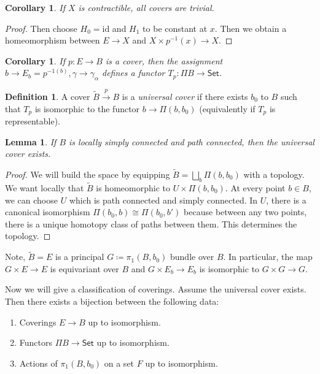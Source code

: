 \documentclass[leqno, openany]{memoir}
\newtheorem{cor}[thm]{Corollary}
\newtheorem{lem}[thm]{Lemma}
\theoremstyle{definition}
\newtheorem{defn}[thm]{Definition}
\theoremstyle{remark}
\theoremstyle{plain}
\theoremstyle{definition}
\theoremstyle{remark}
\newcommand{\mr}[1]{\mathrm{#1}}
\newcommand{\ms}[1]{\mathsf{#1}}
\newcommand{\wt}[1]{\widetilde{#1}}
\begin{document}
\begin{cor} If $X$ is contractible, all covers are trivial.  \end{cor}

\begin{proof} Then choose $H_0 = \mr{id}$ and $H_1$ to be constant at $x$. Then
we obtain a homeomorphism between $E \to X$ and $X \times p^{-1}(x) \to X$.
\end{proof}

\begin{cor} If $p: E \to B$ is a cover, then the assignment $b \to E_b =
p^{-1(b)}, \gamma \to \gamma_{\alpha}$ defines a functor $T_p: \Pi B \to
\ms{Set}$.  \end{cor}

\begin{defn} A cover $\wt{B} \xrightarrow{p} B$ is a \textit{universal cover}
if there exists $b_0$ to $B$ such that $T_p$ is isomorphic to the functor $b
\to \Pi(b,b_0)$ (equivalently if $T_p$ is representable).  \end{defn}

\begin{lem} If $B$ is locally simply connected and path connected, then the
universal cover exists.  \end{lem}

\begin{proof} We will build the space by equipping $\wt{B} = \bigsqcup_b
    \Pi(b,b_0)$ with a topology. We want locally that $\wt{B}$ is homeomorphic
    to $U \times \Pi(b,b_0)$. At every point $b \in B$, we can choose $U$ which
    is path connected and simply connected. In $U$, there is a canonical
    isomorphism $\Pi(b_0,b) \cong \Pi(b_0,b')$ because between any two points,
    there is a unique homotopy class of paths between them. This determines the
    topology.  \end{proof}

Note, $\wt{B} = E$ is a principal $G \coloneqq \pi_1(B,b_0)$ bundle over $B$.
In particular, the map $G \times E \to E$ is equivariant over $B$ and $G \times
E_b \to E_b$ is isomorphic to $G \times G \to G$.

Now we will give a classification of coverings. Assume the universal cover
exists. Then there exists a bijection between the following data:
\begin{enumerate} \item Coverings $E \to B$ up to isomorphism.  \item Functors
    $\Pi B \to \ms{Set}$ up to isomorphism.  \item Actions of $\pi_1(B,b_0)$ on
    a set $F$ up to isomorphism.  \end{enumerate}
\end{document}
